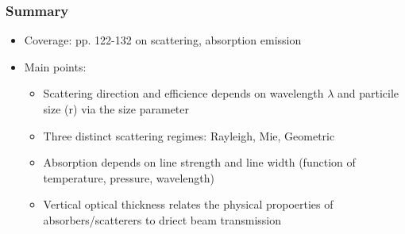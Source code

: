 \documentclass[hyperref={colorlinks=true,linkcolor=blue,urlcolor=blue},numbers]{beamer}
\begin{document}
\begin{frame}
  \frametitle{Summary}

  \begin{itemize}
  \item Coverage: pp. 122-132 on scattering, absorption emission
  \item Main points:
    \begin{itemize}
    \item Scattering direction and efficience depends on wavelength $\lambda$ and particile size (r) via the size parameter
    \item Three distinct scattering regimes:  Rayleigh, Mie, Geometric
    \item Absorption depends on line strength and line width (function of temperature, pressure, wavelength)
    \item Vertical optical thickness relates the physical propoerties of absorbers/scatterers to driect beam transmission
    \end{itemize}
  \end{itemize}
\end{frame}
\end{document}

